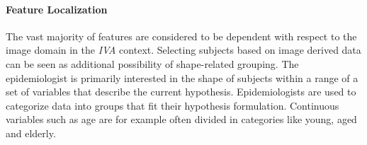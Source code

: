 \documentclass[journal]{style/vgtc} 			          %
\begin{document}
\paragraph{Feature Localization}
The vast majority of features are considered to be dependent with respect to the image domain in the \emph{IVA} context.
%
Selecting subjects based on image derived data can be seen as additional possibility of shape-related grouping.
%
The epidemiologist is primarily interested in the shape of subjects within a range of a set of variables that describe the current hypothesis.
%
Epidemiologists are used to categorize data into groups that fit their hypothesis formulation.
%
Continuous variables such as age are for example often divided in categories like young, aged and elderly.
%
%

\end{document}
